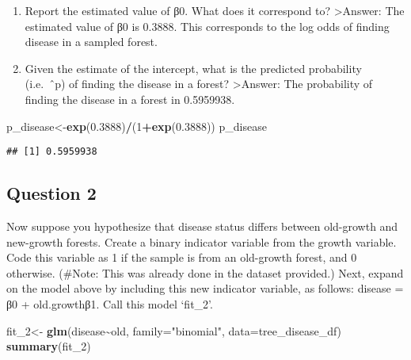 \documentclass[
]{article}
\newenvironment{Shaded}{\begin{snugshade}}{\end{snugshade}}
\newcommand{\AttributeTok}[1]{\textcolor[rgb]{0.13,0.29,0.53}{#1}}
\newcommand{\DecValTok}[1]{\textcolor[rgb]{0.00,0.00,0.81}{#1}}
\newcommand{\FloatTok}[1]{\textcolor[rgb]{0.00,0.00,0.81}{#1}}
\newcommand{\FunctionTok}[1]{\textcolor[rgb]{0.13,0.29,0.53}{\textbf{#1}}}
\newcommand{\NormalTok}[1]{#1}
\newcommand{\OtherTok}[1]{\textcolor[rgb]{0.56,0.35,0.01}{#1}}
\newcommand{\SpecialCharTok}[1]{\textcolor[rgb]{0.81,0.36,0.00}{\textbf{#1}}}
\newcommand{\StringTok}[1]{\textcolor[rgb]{0.31,0.60,0.02}{#1}}
\begin{document}
\begin{enumerate}
\def\labelenumi{\alph{enumi}.}
\item
  Report the estimated value of β0. What does it correspond to?
  \textgreater Answer: The estimated value of β0 is 0.3888. This
  corresponds to the log odds of finding disease in a sampled forest.
\item
  Given the estimate of the intercept, what is the predicted probability
  (i.e.~ˆp) of finding the disease in a forest? \textgreater Answer: The
  probability of finding the disease in a forest in 0.5959938.
\end{enumerate}

\begin{Shaded}
\begin{Highlighting}[]
\NormalTok{p\_disease}\OtherTok{\textless{}{-}}\FunctionTok{exp}\NormalTok{(}\FloatTok{0.3888}\NormalTok{)}\SpecialCharTok{/}\NormalTok{(}\DecValTok{1}\SpecialCharTok{+}\FunctionTok{exp}\NormalTok{(}\FloatTok{0.3888}\NormalTok{))}
\NormalTok{p\_disease}
\end{Highlighting}
\end{Shaded}

\begin{verbatim}
## [1] 0.5959938
\end{verbatim}

\hypertarget{question-2}{%
\subsection{Question 2}\label{question-2}}

Now suppose you hypothesize that disease status differs between
old-growth and new-growth forests. Create a binary indicator variable
from the growth variable. Code this variable as 1 if the sample is from
an old-growth forest, and 0 otherwise. (\#Note: This was already done in
the dataset provided.) Next, expand on the model above by including this
new indicator variable, as follows: disease = β0 + old.growthβ1. Call
this model `fit\_2'.

\begin{Shaded}
\begin{Highlighting}[]
\NormalTok{fit\_2}\OtherTok{\textless{}{-}} \FunctionTok{glm}\NormalTok{(disease}\SpecialCharTok{\textasciitilde{}}\NormalTok{old, }\AttributeTok{family=}\StringTok{"binomial"}\NormalTok{, }\AttributeTok{data=}\NormalTok{tree\_disease\_df)}
\FunctionTok{summary}\NormalTok{(fit\_2)}
\end{Highlighting}
\end{Shaded}
\end{document}
